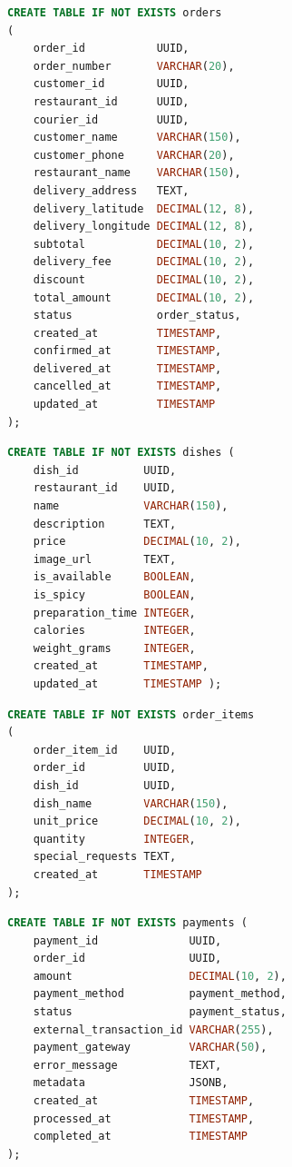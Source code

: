\begin{lstlisting}[caption={Создание таблицы \code{orders}}, label={lst:sql_orders}, language=SQL]
CREATE TABLE IF NOT EXISTS orders
(
    order_id           UUID,
    order_number       VARCHAR(20),
    customer_id        UUID,
    restaurant_id      UUID,
    courier_id         UUID,
    customer_name      VARCHAR(150),
    customer_phone     VARCHAR(20),
    restaurant_name    VARCHAR(150),
    delivery_address   TEXT,
    delivery_latitude  DECIMAL(12, 8),
    delivery_longitude DECIMAL(12, 8),
    subtotal           DECIMAL(10, 2),
    delivery_fee       DECIMAL(10, 2),
    discount           DECIMAL(10, 2),
    total_amount       DECIMAL(10, 2),
    status             order_status,
    created_at         TIMESTAMP,
    confirmed_at       TIMESTAMP,
    delivered_at       TIMESTAMP,
    cancelled_at       TIMESTAMP,
    updated_at         TIMESTAMP
);
\end{lstlisting}

\begin{lstlisting}[caption={Создание таблицы \code{dishes}}, label={lst:sql_dishes}, language=SQL]
CREATE TABLE IF NOT EXISTS dishes (
    dish_id          UUID,
    restaurant_id    UUID,
    name             VARCHAR(150),
    description      TEXT,
    price            DECIMAL(10, 2),
    image_url        TEXT,
    is_available     BOOLEAN,
    is_spicy         BOOLEAN,
    preparation_time INTEGER,
    calories         INTEGER,
    weight_grams     INTEGER,
    created_at       TIMESTAMP,
    updated_at       TIMESTAMP );
\end{lstlisting}

\begin{lstlisting}[caption={Создание таблицы \code{order\_items}}, label={lst:sql_order_items}, language=SQL]
CREATE TABLE IF NOT EXISTS order_items
(
    order_item_id    UUID,
    order_id         UUID,
    dish_id          UUID,
    dish_name        VARCHAR(150),
    unit_price       DECIMAL(10, 2),
    quantity         INTEGER,
    special_requests TEXT,
    created_at       TIMESTAMP
);
\end{lstlisting}

\begin{lstlisting}[caption={Создание таблицы \code{payments}}, label={lst:sql_payments}, language=SQL]
CREATE TABLE IF NOT EXISTS payments (
    payment_id              UUID,
    order_id                UUID,
    amount                  DECIMAL(10, 2),
    payment_method          payment_method,
    status                  payment_status,
    external_transaction_id VARCHAR(255),
    payment_gateway         VARCHAR(50),
    error_message           TEXT,
    metadata                JSONB,
    created_at              TIMESTAMP,
    processed_at            TIMESTAMP,
    completed_at            TIMESTAMP
);
\end{lstlisting}

